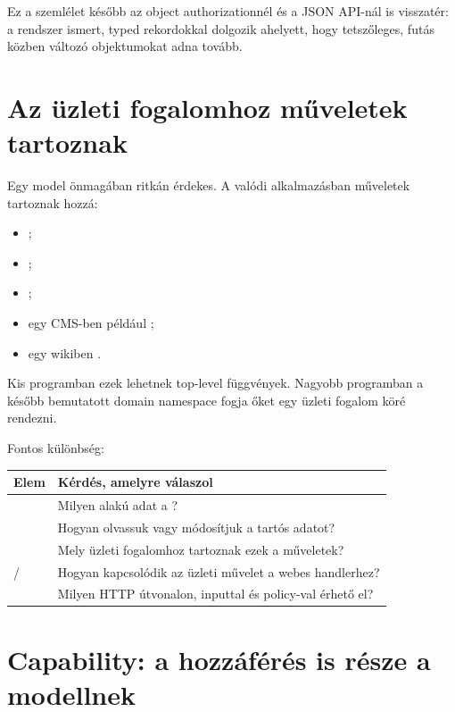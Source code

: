 Ez a szemlélet később az object authorizationnél és a JSON API-nál is visszatér: a rendszer ismert, typed rekordokkal dolgozik ahelyett, hogy tetszőleges, futás közben változó objektumokat adna tovább.

\section{Az üzleti fogalomhoz műveletek tartoznak}

Egy model önmagában ritkán érdekes. A valódi alkalmazásban műveletek tartoznak hozzá:

\begin{itemize}
  \item {};
  \item {};
  \item {};
  \item egy CMS-ben például ;
  \item egy wikiben .
\end{itemize}

Kis programban ezek lehetnek top-level függvények. Nagyobb programban a később bemutatott  domain namespace fogja őket egy üzleti fogalom köré rendezni.

Fontos különbség:

\begin{center}
\begin{tabularx}{\textwidth}{@{}lY@{}}
\toprule
Elem & Kérdés, amelyre válaszol \\
\midrule
{} & Milyen alakú adat a ? \\
 & Hogyan olvassuk vagy módosítjuk a tartós adatot? \\
 & Mely üzleti fogalomhoz tartoznak ezek a műveletek? \\
/ & Hogyan kapcsolódik az üzleti művelet a webes handlerhez? \\
 & Milyen HTTP útvonalon, inputtal és policy-val érhető el? \\
\bottomrule
\end{tabularx}
\end{center}

\section{Capability: a hozzáférés is része a modellnek}

